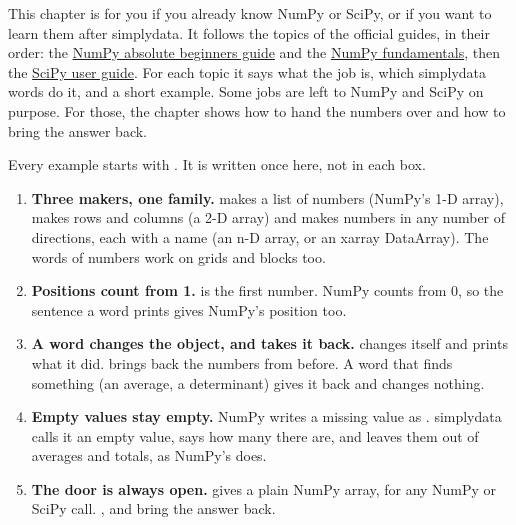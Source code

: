 

This chapter is for you if you already know NumPy or SciPy, or if you want to learn them after
simplydata. It follows the topics of the official guides, in their order: the
\href{https://numpy.org/doc/stable/user/absolute_beginners.html}{NumPy absolute beginners guide} and
the \href{https://numpy.org/doc/stable/user/basics.html}{NumPy fundamentals}, then the
\href{https://docs.scipy.org/doc/scipy/tutorial/index.html}{SciPy user guide}. For each topic it says
what the job is, which simplydata words do it, and a short example. Some jobs are left to NumPy and
SciPy on purpose. For those, the chapter shows how to hand the numbers over and how to bring the
answer back.

Every example starts with . It is written once here, not in each box.


\begin{enumerate}
  \item \textbf{Three makers, one family.}  makes a list of numbers (NumPy's
    1-D array),  makes rows and columns (a 2-D array) and
     makes numbers in any number of directions, each with a name (an n-D
    array, or an xarray DataArray). The words of numbers work on grids and blocks too.
  \item \textbf{Positions count from 1.}  is the first number. NumPy
    counts from 0, so the sentence a word prints gives NumPy's position too.
  \item \textbf{A word changes the object, and  takes it back.} 
    changes  itself and prints what it did.  brings back the numbers
    from before. A word that finds something (an average, a determinant) gives it back and changes
    nothing.
  \item \textbf{Empty values stay empty.} NumPy writes a missing value as . simplydata calls it
    an empty value, says how many there are, and leaves them out of averages and totals, as NumPy's
     does.
  \item \textbf{The door is always open.}  gives a plain NumPy array,
    for any NumPy or SciPy call. ,  and
     bring the answer back.
\end{enumerate}

